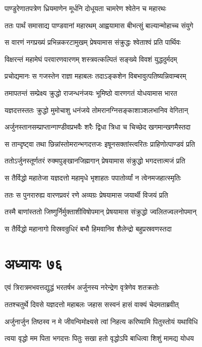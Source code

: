 \twolineshloka
{पाण्डुरेणातपत्रेण ध्रियमाणेन मूर्धनि}
{दोधूयता चामरेण श्वेतेन च महारथः}


\twolineshloka
{ततः पार्थं समासाद्य पाण्डवानां महारथम्}
{आह्वयामास बीभत्सुं बाल्यान्मोहाच्च संयुगे}


\twolineshloka
{स वारणं नगप्रख्यं प्रभिन्नकरटामुखम्}
{प्रेषयामास संक्रुद्धः श्वेताश्वं प्रति पार्थिवः}


\twolineshloka
{विक्षरन्तं महामेघं परवारणवारणम्}
{शस्त्रवत्कल्पितं सङ्ख्ये विवशं युद्धदुर्मदम्}


\twolineshloka
{प्रचोद्यमानः स गजस्तेन राज्ञा महाबलः}
{तदाऽङ्कशेन विबभावुत्पतिष्यन्निवाम्बरम्}


\twolineshloka
{तमापतन्तं सम्प्रेक्ष्य क्रुद्धो राजन्धनंजयः}
{भूमिष्ठो वारणगतं योधयामास भारत}


\twolineshloka
{यज्ञदत्तस्ततः क्रुद्धो मुमोचाशु धनंजये}
{तोमरानग्निसङ्काशाञ्शलभानिव वेगितान्}


\twolineshloka
{अर्जुनस्तानसम्प्राप्तान्गाण्डीवप्रभवैः शरैः}
{द्विधा त्रिधा च चिच्छेद खगमान्खगमैस्तदा}


\twolineshloka
{स तान्दृष्ट्वा तथा छिन्नांस्तोमरान्भगदत्तजः}
{इषूनसक्तांस्त्वरितः प्राहिणोत्पाण्डवं प्रति}


\twolineshloka
{ततोऽर्जुनस्तूर्णतरं रुक्मपुङ्खानजिह्मगान्}
{प्रेषयामास संक्रुद्धो भगदत्तात्मजं प्रति}


\twolineshloka
{स तैर्विद्धो महातेजा यज्ञदत्तो महामृधे}
{भृशाहतः पपातोर्व्यां न त्वेनमजहात्स्मृतिः}


\twolineshloka
{ततः स पुनरारुह्य वारणप्रवरं रणे}
{अव्यग्रः प्रेषयामास जयार्थी विजयं प्रति}


\twolineshloka
{तस्मै बाणांस्ततो जिष्णुर्निर्मुक्ताशीविषोपमान्}
{प्रेषयामास संक्रुद्धो ज्वलितज्वलनोपमान्}


\twolineshloka
{स तैर्विद्धो महानागो विस्रवन्रुधिरं बभौ}
{हिमवानिव शैलेन्द्रो बहुप्रस्रवणस्तदा}


\chapter{अध्यायः ७६}
\twolineshloka
{एवं त्रिरात्रमभवत्तद्युद्धं भरतर्षभ}
{अर्जुनस्य नरेन्द्रेण वृत्रेणेव शतक्रतोः}


\twolineshloka
{ततश्चतुर्थे दिवसे यज्ञदत्तो महाबलः}
{जहास सस्वनं हासं वाक्यं चेदमताब्रवीत्}


\twolineshloka
{अर्जुनार्जुन तिष्ठस्व न मे जीवन्विमोक्ष्यसे}
{त्वां निहत्य करिष्यामि पितुस्तोयं यथाविधि}


\twolineshloka
{त्वया वृद्धो मम पिता भगदत्तः पितुः सखा}
{हतो वृद्धोऽपि बाधित्वा शिशुं मामद्य योधय}


